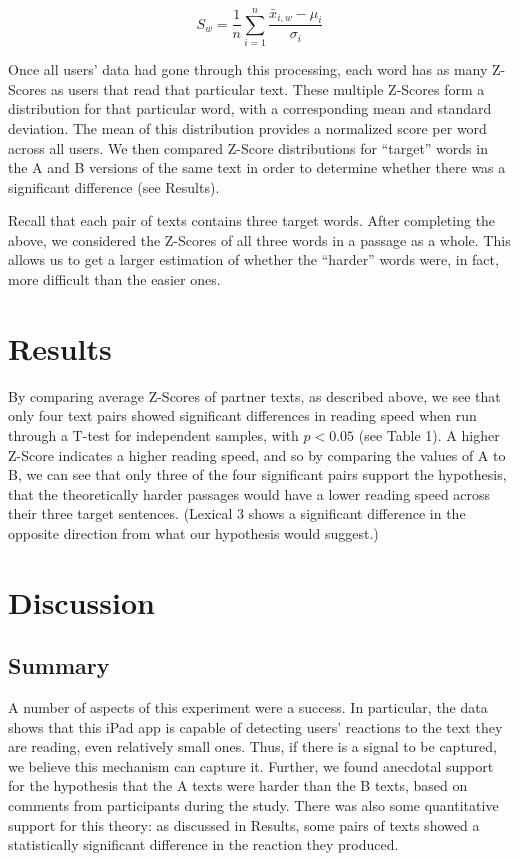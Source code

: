 \documentclass[11pt,letterpaper]{article}
\begin{document}
	\[ S_w = \frac1n \sum_{i=1}^n \frac{\bar{x}_{i,w} - \mu_i}{\sigma_i} \]
	
	Once all users' data had gone through this processing, each word has as many Z-Scores as users that read that particular text. These multiple Z-Scores form a distribution for that particular word, with a corresponding mean and standard deviation. The mean of this distribution provides a normalized score per word across all users. We then compared Z-Score distributions for ``target'' words in the A and B versions of the same text in order to determine whether there was a significant difference (see Results). 
	
	Recall that each pair of texts contains three target words. After completing the above, we considered the Z-Scores of all three words in a passage as a whole. This allows us to get a larger estimation of whether the ``harder'' words were, in fact, more difficult than the easier ones.
	
	
	\section{Results}
	
	By comparing average Z-Scores of partner texts, as described above, we see that only four text pairs showed significant differences in reading speed when run through a T-test for independent samples, with $p < 0.05$  (see Table 1). A higher Z-Score indicates a higher reading speed, and so by comparing the values of A to B, we can see that only three of the four significant pairs support the hypothesis, that the theoretically harder passages would have a lower reading speed across their three target sentences. (Lexical 3 shows a significant difference in the opposite direction from what our hypothesis would suggest.)
	
	\section{Discussion}
	
	\subsection{Summary}
	
	A number of aspects of this experiment were a success. In particular, the data shows that this iPad app is capable of detecting users' reactions to the text they are reading, even relatively small ones. Thus, if there is a signal to be captured, we believe this mechanism can capture it. Further, we found anecdotal support for the hypothesis that the A texts were harder than the B texts, based on comments from participants during the study. There was also some quantitative support for this theory: as discussed in Results, some pairs of texts showed a statistically significant difference in the reaction they produced. 
	
\end{document}
